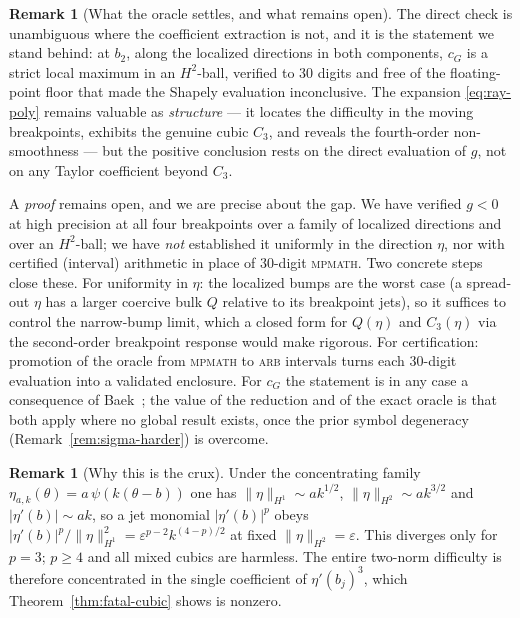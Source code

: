 \documentclass[11pt]{amsart}
\theoremstyle{plain}
\theoremstyle{definition}
\newtheorem{remark}[theorem]{Remark}
\newcommand{\cG}{c_{G}}
\begin{document}
\begin{remark}[What the oracle settles, and what remains open]
\label{rem:quartic-status}
The direct check is unambiguous where the coefficient extraction is not,
and it is the statement we stand behind: at $b_{2}$, along the localized
directions in both components, $\cG$ is a strict local maximum in an
$H^{2}$-ball, verified to $30$ digits and free of the floating-point
floor that made the Shapely evaluation inconclusive.  The expansion
\eqref{eq:ray-poly} remains valuable as \emph{structure} --- it locates
the difficulty in the moving breakpoints, exhibits the genuine cubic
$C_{3}$, and reveals the fourth-order non-smoothness --- but the
positive conclusion rests on the direct evaluation of $g$, not on any
Taylor coefficient beyond $C_{3}$.

A \emph{proof} remains open, and we are precise about the gap.  We have
verified $g<0$ at high precision at all four breakpoints over a family
of localized directions and over an $H^{2}$-ball; we have \emph{not}
established it uniformly in the direction $\eta$, nor with certified
(interval) arithmetic in place of $30$-digit \textsc{mpmath}.  Two
concrete steps close these.  For uniformity in $\eta$: the localized
bumps are the worst case (a spread-out $\eta$ has a larger coercive bulk
$Q$ relative to its breakpoint jets), so it suffices to control the
narrow-bump limit, which a closed form for $Q(\eta)$ and $C_{3}(\eta)$
via the second-order breakpoint response would make rigorous.  For
certification: promotion of the oracle from \textsc{mpmath} to
\textsc{arb} intervals turns each $30$-digit evaluation into a validated
enclosure.  For $\cG$ the statement is in any case a consequence of
Baek~\cite{Baek2024}; the value of the reduction and of the exact oracle
is that both apply where no global result exists, once the prior symbol
degeneracy (Remark~\ref{rem:sigma-harder}) is overcome.
\end{remark}

\begin{remark}[Why this is the crux]\label{rem:fatal-cubic}
Under the concentrating family $\eta_{a,k}(\theta) =
a\,\psi(k(\theta-b))$ one has $\|\eta\|_{H^{1}}\sim ak^{1/2}$,
$\|\eta\|_{H^{2}}\sim ak^{3/2}$ and $|\eta'(b)|\sim ak$, so a jet
monomial $|\eta'(b)|^{p}$ obeys
$|\eta'(b)|^{p}/\|\eta\|^{2}_{H^{1}} = \varepsilon^{p-2}k^{(4-p)/2}$
at fixed $\|\eta\|_{H^{2}}=\varepsilon$.  This diverges only for
$p=3$; $p\geq4$ and all mixed cubics are harmless.  The entire
two-norm difficulty is therefore concentrated in the single
coefficient of $\eta'(b_{j})^{3}$, which
Theorem~\ref{thm:fatal-cubic} shows is nonzero.
\end{remark}
\end{document}
